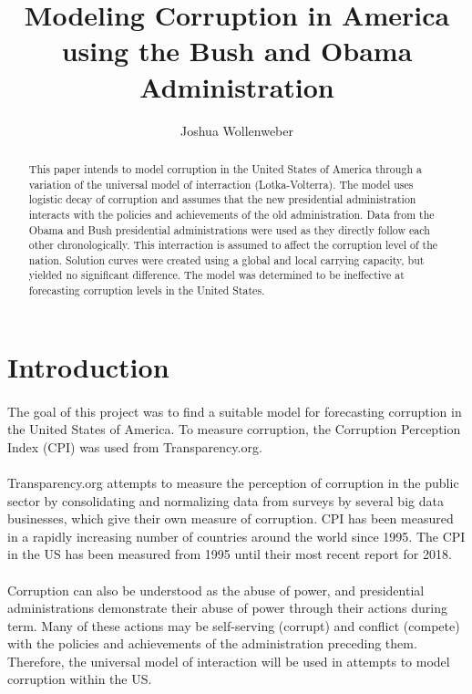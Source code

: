 \documentclass{article}
\title{Modeling Corruption in America using the Bush and Obama Administration}
\author{Joshua Wollenweber}
\begin{document}
\maketitle

	\begin{abstract}
	This paper intends to model corruption in the United States of America through a variation of the universal model of interraction (Lotka-Volterra). The model uses logistic decay of corruption and assumes that the new presidential administration interacts with the policies and achievements of the old administration. Data from the Obama and Bush presidential administrations were used as they directly follow each other chronologically. This interraction is assumed to affect the corruption level of the nation. Solution curves were created using a global and local carrying capacity, but yielded no significant difference. The model was determined to be ineffective at forecasting corruption levels in the United States.
	\end{abstract}

	\newpage
	\section{Introduction}
	\paragraph{}
	The goal of this project was to find a suitable model for forecasting corruption in the United States of America. To measure corruption, the Corruption Perception Index (CPI) was used from Transparency.org.
	\paragraph{}
	Transparency.org attempts to measure the perception of corruption in the public sector by consolidating and normalizing data from surveys by several big data businesses, which give their own measure of corruption. CPI has been measured in a rapidly increasing number of countries around the world since 1995. The CPI in the US has been measured from 1995 until their most recent report for 2018. 
	\paragraph{}
	Corruption can also be understood as the abuse of power, and presidential administrations demonstrate their abuse of power through their actions during term. Many of these actions may be self-serving (corrupt) and conflict (compete) with the policies and achievements of the administration preceding them. Therefore, the universal model of interaction will be used in attempts to model corruption within the US.
\end{document}
